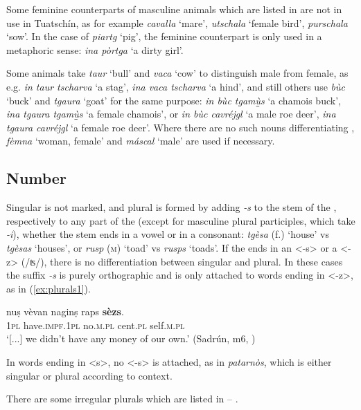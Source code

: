 Some feminine counterparts of masculine animals which are listed in \citet[239f.]{Spescha1989} are not in use in Tuatschín, as for example \textit{cavalla} `mare', \textit{utschala} `female bird', \textit{purschala} `sow'. In the case of \textit{piartg} `pig', the feminine counterpart is only used in a metaphoric sense: \textit{ina pòrtga} `a dirty girl'.

Some animals take \textit{taur} `bull' and \textit{vaca} `cow' to distinguish male from female, as e.g. \textit{in taur tscharva} `a stag', \textit{ina vaca tscharva} `a hind', and still others use \textit{bùc} `buck' and \textit{tgaura} `goat' for the same purpose: \textit{in bùc tgam{\`u̱̱}s} `a chamois buck', \textit{ina tgaura tgam{\`u̱̱}s} `a female chamois', or \textit{in bùc cavréjgl} `a male roe deer', \textit{ina tgaura cavréjgl} `a female roe deer'. Where there are no such nouns differentiating , \textit{fèmna} `woman, female' and \textit{máscal} `male' are used if necessary.

\subsection{Number}\label{sec:3.1.2}
Singular is not marked, and plural is formed by adding \textit{-s} to the stem of the , respectively to any part of the  (except for masculine plural participles, which take \textit{-i}), whether the stem ends in a vowel or in a consonant: \textit{tgèsa} (f.) `house' vs \textit{tgèsas} `houses', or \textit{rusp} (\textsc{m}) `toad' vs \textit{rusps} `toads'. If the  ends in an <-s> or a <-z> (/ʦ/), there is no differentiation between singular and plural. In these cases the suffix \textit{-s} is purely orthographic and is only attached to words ending in <-z>, as in (\ref{ex:plurals1}). 

\ea
\label{ex:plurals1}
\gll [...] nuṣ vèvan naginṣ raps \textbf{sèzs}.\\
{} \textsc{1pl} have.\textsc{impf.1pl}  no.\textsc{m.pl} cent.\textsc{pl} self.\textsc{m.pl}\\
\glt `[...] we didn’t have any money of our own.' (Sadrún, m6, )
\z

In words ending in <s>, no <-s> is attached, as  in \textit{patarnòs}, which is either singular or plural according to context.


There are some irregular plurals which are listed in  -- . 

